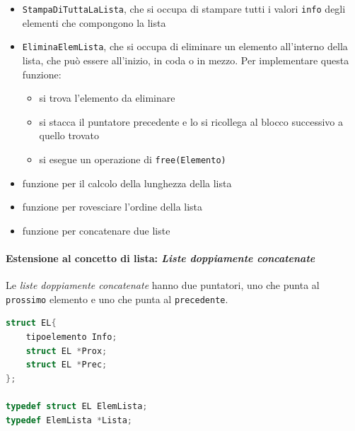 \documentclass[
  paper=a4,
  oneside  ,captions=tableheading
]{scrbook}
\newcommand{\passthrough}[1]{#1}
\providecommand{\tightlist}{%
  \setlength{\itemsep}{0pt}\setlength{\parskip}{0pt}}
\begin{document}
\begin{itemize}
  \begin{itemize}
  \tightlist
  \item
    \passthrough{\lstinline!StampaDiTuttaLaLista!}, che si occupa di
    stampare tutti i valori \passthrough{\lstinline!info!} degli
    elementi che compongono la lista
  \item
    \passthrough{\lstinline!EliminaElemLista!}, che si occupa di
    eliminare un elemento all'interno della lista, che può essere
    all'inizio, in coda o in mezzo. Per implementare questa funzione:

    \begin{itemize}
    \tightlist
    \item
      si trova l'elemento da eliminare
    \item
      si stacca il puntatore precedente e lo si ricollega al blocco
      successivo a quello trovato
    \item
      si esegue un operazione di
      \passthrough{\lstinline!free(Elemento)!}
    \end{itemize}
  \item
    funzione per il calcolo della lunghezza della lista
  \item
    funzione per rovesciare l'ordine della lista
  \item
    funzione per concatenare due liste
  \end{itemize}
\end{itemize}

\hypertarget{estensione-al-concetto-di-lista-liste-doppiamente-concatenate}{%
\paragraph{\texorpdfstring{Estensione al concetto di lista: \emph{Liste
doppiamente
concatenate}}{Estensione al concetto di lista: Liste doppiamente concatenate}}\label{estensione-al-concetto-di-lista-liste-doppiamente-concatenate}}

Le \emph{liste doppiamente concatenate} hanno due puntatori, uno che
punta al \passthrough{\lstinline!prossimo!} elemento e uno che punta al
\passthrough{\lstinline!precedente!}.

\begin{lstlisting}[language=C]
struct EL{
    tipoelemento Info;
    struct EL *Prox;
    struct EL *Prec;
}; 

typedef struct EL ElemLista;
typedef ElemLista *Lista;
\end{lstlisting}
\end{document}
